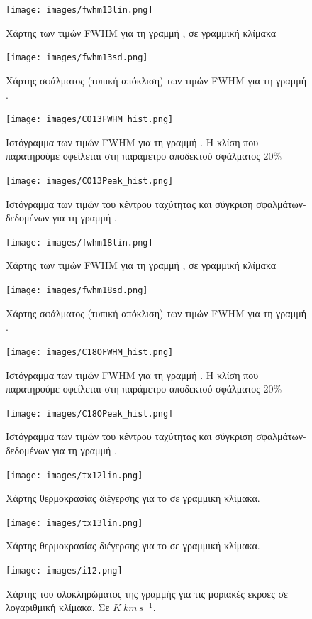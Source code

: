 \documentclass[a4paper,12pt]{memoir}
\begin{document}
\begin{figure}[h]
	\centering
	\texttt{[image: images/fwhm13lin.png]}
	\caption{Χάρτης των τιμών FWHM για τη γραμμή , σε γραμμική κλίμακα}
	
	\centering
	\texttt{[image: images/fwhm13sd.png]}
	\caption{Χάρτης σφάλματος (τυπική απόκλιση) των τιμών FWHM για τη γραμμή .}
\end{figure}

\begin{figure}[h]
	\centering
	\texttt{[image: images/CO13FWHM\_hist.png]}
	\caption{Ιστόγραμμα των τιμών FWHM για τη γραμμή . Η κλίση που παρατηρούμε οφείλεται στη παράμετρο αποδεκτού σφάλματος 20\%}
	
	\centering
	\texttt{[image: images/CO13Peak\_hist.png]}
	\caption{Ιστόγραμμα των τιμών του κέντρου ταχύτητας και σύγκριση σφαλμάτων-δεδομένων για τη γραμμή .}
\end{figure}

\begin{figure}[h]
	\centering
	\texttt{[image: images/fwhm18lin.png]}
	\caption{Χάρτης των τιμών FWHM για τη γραμμή , σε γραμμική κλίμακα}
	
	\centering
	\texttt{[image: images/fwhm18sd.png]}
	\caption{Χάρτης σφάλματος (τυπική απόκλιση) των τιμών FWHM για τη γραμμή .}
\end{figure}


\begin{figure}[h]
	\centering
	\texttt{[image: images/C18OFWHM\_hist.png]}
	\caption{Ιστόγραμμα των τιμών FWHM για τη γραμμή . Η κλίση που παρατηρούμε οφείλεται στη παράμετρο αποδεκτού σφάλματος 20\%}
	
	\centering
	\texttt{[image: images/C18OPeak\_hist.png]}
	\caption{Ιστόγραμμα των τιμών του κέντρου ταχύτητας και σύγκριση σφαλμάτων-δεδομένων για τη γραμμή .}
\end{figure}

\begin{figure}[h]
	\centering
	\texttt{[image: images/tx12lin.png]}
	\caption{Χάρτης θερμοκρασίας διέγερσης για το  σε γραμμική κλίμακα.}
	\centering
	\texttt{[image: images/tx13lin.png]}
	\caption{Χάρτης θερμοκρασίας διέγερσης για το  σε γραμμική κλίμακα.}
\end{figure}


\begin{figure}[h]
	\centering
	\texttt{[image: images/i12.png]}
	\caption{Χάρτης του ολοκληρώματος της γραμμής  για τις μοριακές εκροές σε λογαριθμική κλίμακα. Σε $K\ km\, s^{-1}$.}
\end{figure}
\end{document}
